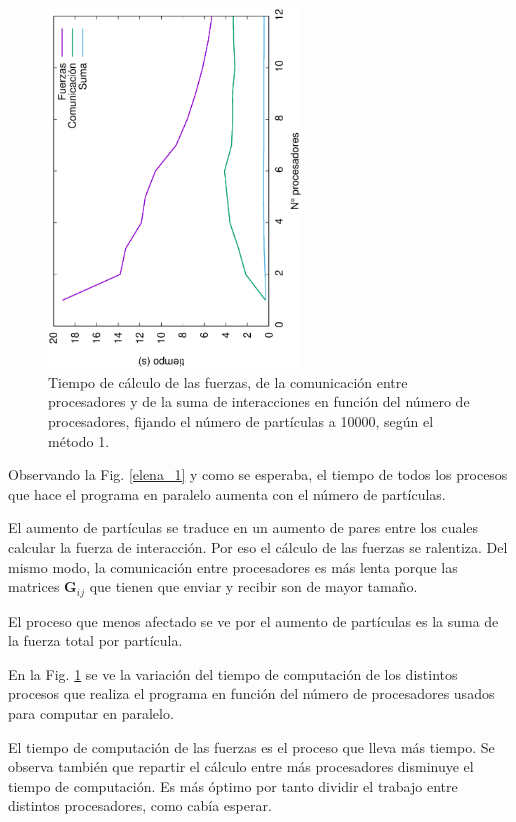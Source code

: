 \documentclass[onecolumn]{article}
\renewcommand{\vec}[1]{\mathbf{#1}}
\begin{document}
\begin{figure}[ht]
\begin{center}
\includegraphics[width=0.6\textwidth, angle=-90]{time_procE.eps}
\caption{Tiempo de cálculo de las fuerzas, de la comunicación entre procesadores y de la suma de interacciones en función del número de procesadores, fijando el número de partículas a 10000, según el método 1.}
\label{elena_2}
\end{center}
\end{figure}

Observando la Fig. \ref{elena_1} y como se esperaba, el tiempo de todos los procesos que hace el programa en paralelo aumenta con el número de partículas.

El aumento de partículas se traduce en un aumento de pares entre los cuales calcular la fuerza de interacción. Por eso el cálculo de las fuerzas se ralentiza. Del mismo modo, la comunicación entre procesadores es más lenta porque las matrices $\vec{G}_{ij}$ que tienen que enviar y recibir son de mayor tamaño. 

El proceso que menos afectado se ve por el aumento de partículas es la suma de la fuerza total por partícula. 

En la Fig. \ref{elena_2} se ve la variación del tiempo de computación de los distintos procesos que realiza el programa en función del número de procesadores usados para computar en paralelo. 

El tiempo de computación de las fuerzas es el proceso que lleva más tiempo.  Se observa también que repartir el cálculo entre más procesadores disminuye el tiempo de computación. Es más óptimo por tanto dividir el trabajo entre distintos procesadores, como cabía esperar.  
\end{document}
